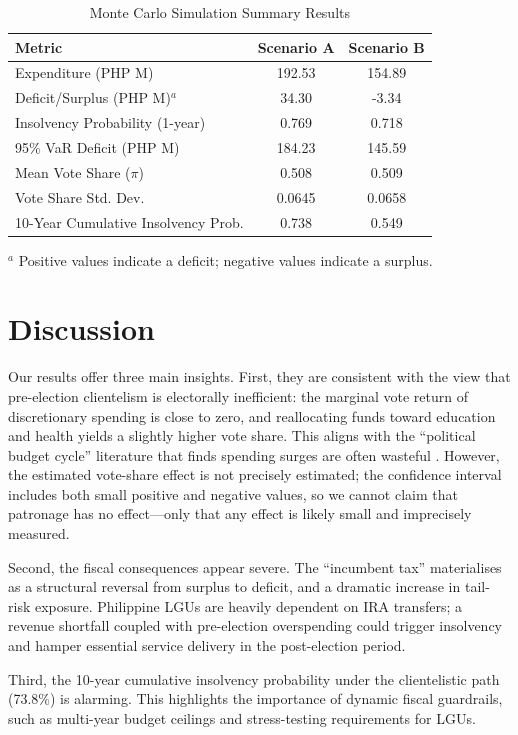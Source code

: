 \documentclass[twocolumn]{article}
\begin{document}
\begin{table}[ht]
\centering
\caption{Monte Carlo Simulation Summary Results}
\label{tab:main}
\small
\begin{tabular}{lcc}
\toprule
Metric & Scenario A & Scenario B \\
\midrule
Expenditure (PHP M) & 192.53 & 154.89 \\
Deficit/Surplus (PHP M)$^a$ & 34.30 & -3.34 \\
Insolvency Probability (1-year) & 0.769 & 0.718 \\
95\% VaR Deficit (PHP M) & 184.23 & 145.59 \\
Mean Vote Share ($\pi$) & 0.508 & 0.509 \\
Vote Share Std. Dev. & 0.0645 & 0.0658 \\
10-Year Cumulative Insolvency Prob. & 0.738 & 0.549 \\
\bottomrule
\end{tabular}
\par\smallskip
\footnotesize{$^a$ Positive values indicate a deficit; negative values indicate a surplus.}
\end{table}

\section{Discussion}

Our results offer three main insights. First, they are consistent with the view that pre-election clientelism is electorally inefficient: the marginal vote return of discretionary spending is close to zero, and reallocating funds toward education and health yields a slightly higher vote share. This aligns with the ``political budget cycle'' literature that finds spending surges are often wasteful \cite{brender2005political}. However, the estimated vote-share effect is not precisely estimated; the confidence interval includes both small positive and negative values, so we cannot claim that patronage has no effect---only that any effect is likely small and imprecisely measured.

Second, the fiscal consequences appear severe. The ``incumbent tax'' materialises as a structural reversal from surplus to deficit, and a dramatic increase in tail-risk exposure. Philippine LGUs are heavily dependent on IRA transfers; a revenue shortfall coupled with pre-election overspending could trigger insolvency and hamper essential service delivery in the post-election period.

Third, the 10-year cumulative insolvency probability under the clientelistic path (73.8\%) is alarming. This highlights the importance of dynamic fiscal guardrails, such as multi-year budget ceilings and stress-testing requirements for LGUs.
\end{document}
